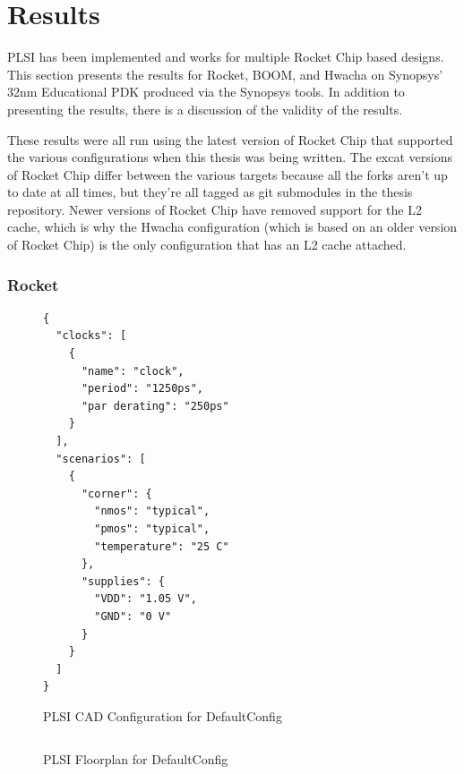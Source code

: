 \documentclass{article}
\begin{document}
\chapter{Results}

PLSI has been implemented and works for multiple Rocket Chip based designs.
This section presents the results for Rocket, BOOM, and Hwacha on Synopsys'
32nm Educational PDK produced via the Synopsys tools.  In addition to
presenting the results, there is a discussion of the validity of the results.

These results were all run using the latest version of Rocket Chip that
supported the various configurations when this thesis was being written.  The
excat versions of Rocket Chip differ between the various targets because all
the forks aren't up to date at all times, but they're all tagged as git
submodules in the thesis repository.  Newer versions of Rocket Chip have
removed support for the L2 cache, which is why the Hwacha configuration (which
is based on an older version of Rocket Chip) is the only configuration that has
an L2 cache attached.

\subsection{Rocket}

\begin{figure}
  \begin{verbatim}
{
  "clocks": [
    {
      "name": "clock",
      "period": "1250ps",
      "par derating": "250ps"
    }
  ],
  "scenarios": [
    {
      "corner": {
        "nmos": "typical",
        "pmos": "typical",
        "temperature": "25 C"
      },
      "supplies": {
        "VDD": "1.05 V",
        "GND": "0 V"
      }
    }
  ]
}
\end{verbatim}
  \caption{PLSI CAD Configuration for DefaultConfig}
  \label{res:rocket-config}
\end{figure}

\begin{figure}
\begin{verbatim}
\end{verbatim}
  \caption{PLSI Floorplan for DefaultConfig}
  \label{res:rocket-fppy}
\end{figure}
\end{document}
